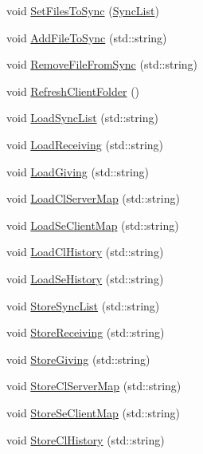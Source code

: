 \begin{DoxyCompactItemize}
\item 
void \hyperlink{classSyncManager_ad04d8a07db8d1679d14c254f94bf3d5a}{Set\-Files\-To\-Sync} (\hyperlink{structSyncList}{Sync\-List})
\item 
void \hyperlink{classSyncManager_a974fa2b840d5325c8cc161e5eca604b6}{Add\-File\-To\-Sync} (std\-::string)
\item 
void \hyperlink{classSyncManager_a8f67e47750484ee604aae6b852c943e4}{Remove\-File\-From\-Sync} (std\-::string)
\item 
void \hyperlink{classSyncManager_a21d8a071af1001c30ff8532ef905b9b9}{Refresh\-Client\-Folder} ()
\item 
void \hyperlink{classSyncManager_acd80fb401a26cf1bc10d56898a7a8c48}{Load\-Sync\-List} (std\-::string)
\item 
void \hyperlink{classSyncManager_ae8fbccde0b88e321fb7eff19f99282eb}{Load\-Receiving} (std\-::string)
\item 
void \hyperlink{classSyncManager_ab7a1b3af9c4c1eb08836fda5cad05b5a}{Load\-Giving} (std\-::string)
\item 
void \hyperlink{classSyncManager_a6fa7027f0ac9e2b68b2db3ee0ddb6115}{Load\-Cl\-Server\-Map} (std\-::string)
\item 
void \hyperlink{classSyncManager_af4653a3cc4224a38e683014174df1414}{Load\-Se\-Client\-Map} (std\-::string)
\item 
void \hyperlink{classSyncManager_a5ad186df0d5a96d8721654f634a219a7}{Load\-Cl\-History} (std\-::string)
\item 
void \hyperlink{classSyncManager_a3d0a70cdee7716a5f7a722087ddafeda}{Load\-Se\-History} (std\-::string)
\item 
void \hyperlink{classSyncManager_ad5e2282546516e98055c0e9c98193e07}{Store\-Sync\-List} (std\-::string)
\item 
void \hyperlink{classSyncManager_a6c06d90ab8836578dee79be2a814a0e9}{Store\-Receiving} (std\-::string)
\item 
void \hyperlink{classSyncManager_a01c0687ce8511c687db45bc92d812462}{Store\-Giving} (std\-::string)
\item 
void \hyperlink{classSyncManager_a0c03db986438f3368c8b655d2b2b27cc}{Store\-Cl\-Server\-Map} (std\-::string)
\item 
void \hyperlink{classSyncManager_a31c4ad74259cb4b63f0b7b31be198ebd}{Store\-Se\-Client\-Map} (std\-::string)
\item 
void \hyperlink{classSyncManager_a7e7af02b1b67fa35c55187f1569cbb27}{Store\-Cl\-History} (std\-::string)
\item 

\end{DoxyCompactItemize}
